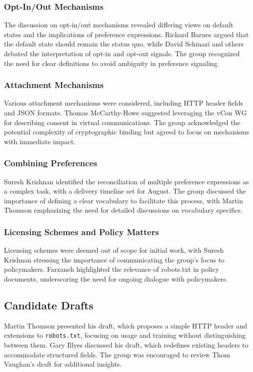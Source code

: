 \documentclass{article}
\begin{document}
\subsubsection{Opt-In/Out Mechanisms}
The discussion on opt-in/out mechanisms revealed differing views on default states and the implications of preference expressions. Richard Barnes argued that the default state should remain the status quo, while David Schinazi and others debated the interpretation of opt-in and opt-out signals. The group recognized the need for clear definitions to avoid ambiguity in preference signaling.

\subsubsection{Attachment Mechanisms}
Various attachment mechanisms were considered, including HTTP header fields and JSON formats. Thomas McCarthy-Howe suggested leveraging the vCon WG for describing consent in virtual communications. The group acknowledged the potential complexity of cryptographic binding but agreed to focus on mechanisms with immediate impact.

\subsubsection{Combining Preferences}
Suresh Krishnan identified the reconciliation of multiple preference expressions as a complex task, with a delivery timeline set for August. The group discussed the importance of defining a clear vocabulary to facilitate this process, with Martin Thomson emphasizing the need for detailed discussions on vocabulary specifics.

\subsubsection{Licensing Schemes and Policy Matters}
Licensing schemes were deemed out of scope for initial work, with Suresh Krishnan stressing the importance of communicating the group's focus to policymakers. Farzaneh highlighted the relevance of robots.txt in policy documents, underscoring the need for ongoing dialogue with policymakers.

\subsection{Candidate Drafts}
Martin Thomson presented his draft, which proposes a simple HTTP header and extensions to \texttt{robots.txt}, focusing on usage and training without distinguishing between them. Gary Illyes discussed his draft, which redefines existing headers to accommodate structured fields. The group was encouraged to review Thom Vaughan's draft for additional insights.
\end{document}
